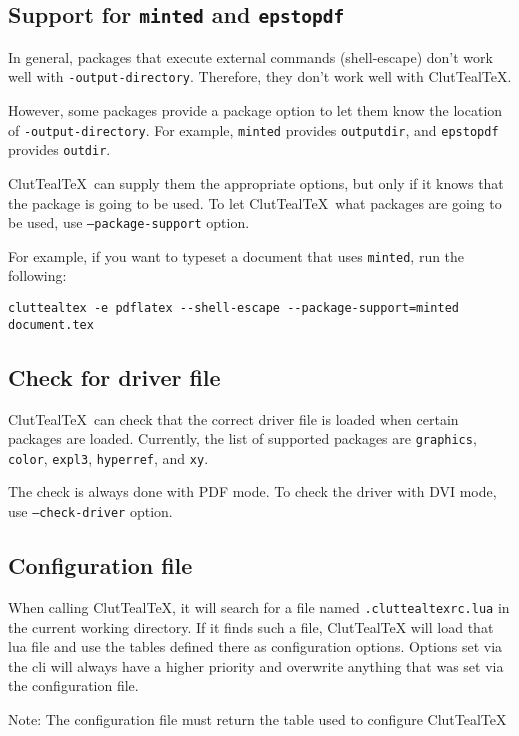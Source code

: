 \documentclass[a4paper, 11pt]{scrartcl}
\newcommand\CluttealTeX{ClutTeal\TeX\xspace}
\newcommand\texpkg[1]{\texttt{#1}}
\begin{document}
\subsection{Support for \texpkg{minted} and \texpkg{epstopdf}}
In general, packages that execute external commands (shell-escape) don't work well with \texttt{-output-directory}.
Therefore, they don't work well with \CluttealTeX.

However, some packages provide a package option to let them know the location of \texttt{-output-directory}.
For example, \texpkg{minted} provides \texttt{outputdir}, and \texpkg{epstopdf} provides \texttt{outdir}.

\CluttealTeX\ can supply them the appropriate options, but only if it knows that the package is going to be used.
To let \CluttealTeX\ what packages are going to be used, use \texttt{--package-support} option.

For example, if you want to typeset a document that uses \texpkg{minted}, run the following:
\begin{verbatim}
cluttealtex -e pdflatex --shell-escape --package-support=minted document.tex
\end{verbatim}

\subsection{Check for driver file}

\CluttealTeX\ can check that the correct driver file is loaded when certain packages are loaded.
Currently, the list of supported packages are \texpkg{graphics}, \texpkg{color}, \texpkg{expl3}, \texpkg{hyperref}, and \texpkg{xy}.

The check is always done with PDF mode.
To check the driver with DVI mode, use \texttt{--check-driver} option.

\subsection{Configuration file}
When calling \CluttealTeX, it will search for a file named \verb|.cluttealtexrc.lua| in the current working directory. If it finds such a file, \CluttealTeX will load that lua file and use the tables defined there as configuration options. Options set via the cli will always have a higher priority and overwrite anything that was set via the configuration file.

Note: The configuration file must return the table used to configure \CluttealTeX
\end{document}
